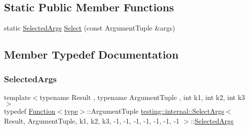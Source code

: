 \subsection*{Static Public Member Functions}
\begin{DoxyCompactItemize}
\item 
static \mbox{\hyperlink{classtesting_1_1internal_1_1_select_args_3_01_result_00_01_argument_tuple_00_01k1_00_01k2_00_01k43121451b69bc30ee1dad887e67d8807_a6780fe203ee6f054ad07b84d9ec68dfd}{Selected\+Args}} \mbox{\hyperlink{classtesting_1_1internal_1_1_select_args_3_01_result_00_01_argument_tuple_00_01k1_00_01k2_00_01k43121451b69bc30ee1dad887e67d8807_a9f107cf68229d35e8ad5c1aa2091bde3}{Select}} (const Argument\+Tuple \&args)
\end{DoxyCompactItemize}


\subsection{Member Typedef Documentation}
\mbox{\label{classtesting_1_1internal_1_1_select_args_3_01_result_00_01_argument_tuple_00_01k1_00_01k2_00_01k43121451b69bc30ee1dad887e67d8807_a6780fe203ee6f054ad07b84d9ec68dfd}} 
\subsubsection{\texorpdfstring{SelectedArgs}{SelectedArgs}}
{\footnotesize\ttfamily template$<$typename Result , typename Argument\+Tuple , int k1, int k2, int k3$>$ \\
typedef \mbox{\hyperlink{structtesting_1_1internal_1_1_function}{Function}}$<$\mbox{\hyperlink{classtesting_1_1internal_1_1_select_args_3_01_result_00_01_argument_tuple_00_01k1_00_01k2_00_01k43121451b69bc30ee1dad887e67d8807_ad8ecea11407ad5d56b86e33af853f265}{type}}$>$\+::Argument\+Tuple \mbox{\hyperlink{classtesting_1_1internal_1_1_select_args}{testing\+::internal\+::\+Select\+Args}}$<$ Result, Argument\+Tuple, k1, k2, k3, -\/1, -\/1, -\/1, -\/1, -\/1, -\/1, -\/1 $>$\+::\mbox{\hyperlink{classtesting_1_1internal_1_1_select_args_3_01_result_00_01_argument_tuple_00_01k1_00_01k2_00_01k43121451b69bc30ee1dad887e67d8807_a6780fe203ee6f054ad07b84d9ec68dfd}{Selected\+Args}}}

